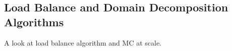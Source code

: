 \subsection{Load Balance and Domain Decomposition Algorithms}

A look at load balance algorithm and MC at scale.

~\cite{o2015particle}
~\cite{o2013scalable}
~\cite{o2009domain}
~\cite{greenman2009enhancements}
~\cite{procassini2005load}
~\cite{o2005dynamic}